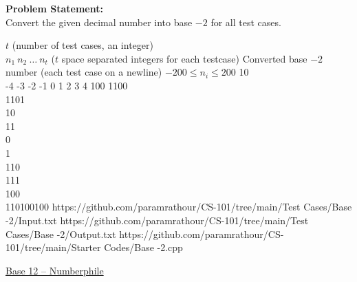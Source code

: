 \documentclass[../../Problems]{subfiles}
\begin{document}
\textbf{Problem Statement:}\\
Convert the given decimal number into base $-2$ for all test cases.
\begin{testcasesMore}
	{$t$ \hfill(number of test cases, an integer)\\
	$n_1\ n_2\ \ldots\ n_t$ \hfill($t$ space separated integers for each testcase)}
	{Converted base $-2$ number \hfill(each test case on a newline)}
	{$-200 \leq n_i \leq 200$}
	{10\\-4 -3 -2 -1 0 1 2 3 4 100}
	{1100\\1101\\10\\11\\0\\1\\110\\111\\100\\110100100}
	{https://github.com/paramrathour/CS-101/tree/main/Test Cases/Base -2/Input.txt}
	{https://github.com/paramrathour/CS-101/tree/main/Test Cases/Base -2/Output.txt}
	{https://github.com/paramrathour/CS-101/tree/main/Starter Codes/Base -2.cpp}
\end{testcasesMore}
\begin{funvideo}
\href{https://youtu.be/U6xJfP7-HCc}{Base 12 -- Numberphile}
\end{funvideo}
\end{document}
